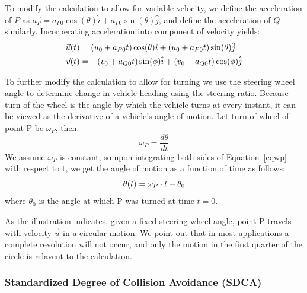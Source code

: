 \documentclass{article}
\begin{document}
To modify the calculation to allow for variable velocity, we define the acceleration of $P$ as $\vec{a_P} = a_{P0}\cos(\theta)\hat{i} + a_{P0}\sin(\theta)\hat{j}$, and define the acceleration of $Q$ similarly.  Incorperating acceleration into component of velocity yields:
\begin{align*}
    \vec{u}(t) &= (u_0 + a_{P0}t) \cos(\theta){i} + (u_0 + a_{P0}t)\sin(\theta) \hat{j} \\
    \vec{v}(t) &= -(v_0+a_{Q0}t) \sin(\phi)\hat{i} + (v_0+a_{Q0}t)\cos(\phi)\hat{j}
\notag
\end{align*}

To further modify the calculation to allow for turning we use the steering wheel angle to determine change in vehicle heading using the steering ratio. Because turn of the wheel is the angle by which the vehicle turns at every instant, it can be viewed as the derivative of a vehicle's angle of motion.  Let turn of wheel of point P be $\omega_P$, then:
\begin{equation}
\omega_P = \frac{d\theta}{dt}   
 \label{eqwp}
\end{equation}
We assume $\omega_P$ is constant, so upon integrating both sides of Equation~\eqref{eqwp} with respect to t, we get the angle of motion as a function of time as follows:\\
\begin{equation}
    \theta(t) = \omega_P \cdot t + \theta_0
    \notag
\end{equation}
where $\theta_0$ is the angle at which P was turned at time $t = 0$.\\
\begin{center}
\end{center}
As the illustration indicates, given a fixed steering wheel angle, point P travels with velocity $\vec{u}$ in a circular motion.  We point out that in most applications a complete revolution will not occur, and only the motion in the first quarter of the circle is relavent to the calculation.

\subsubsection{Standardized Degree of Collision Avoidance (SDCA)}
\end{document}

